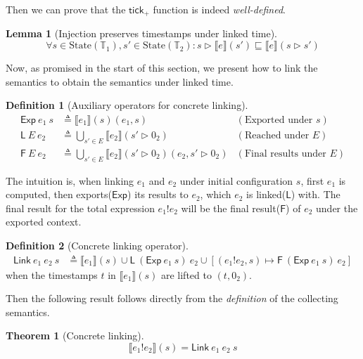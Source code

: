 \documentclass[acmsmall,review]{acmart}\settopmatter{printfolios=true,printccs=false,printacmref=false}
\theoremstyle{definition}
\newtheorem{definition}{Definition}[section]
\newtheorem{lem}{Lemma}[section]
\newtheorem{thm}{Theorem}[section]
\newcommand*{\Time}{\mathbb{T}}
\newcommand*{\State}[1]{\text{State}({#1})}
\newcommand*{\link}[2]{{#1}\mathtt{!}{#2}}
\newcommand*{\EE}{\mathsf{Exp}}
\newcommand*{\LL}{\mathsf{L}}
\newcommand*{\Link}{\mathsf{Link}}
\newcommand*{\sembracket}[1]{\lBrack{#1}\rBrack}
\newcommand*{\tick}{\mathsf{tick}}
\begin{document}
Then we can prove that the $\tick_+$ function is indeed \emph{well-defined}.

\begin{lem}[Injection preserves timestamps under linked time]
  \[
    \forall s\in\State{\Time_1},s'\in\State{\Time_2}:{s}\rhd{\sembracket{e}}({s'})\sqsubseteq{\sembracket{e}}({s}\rhd{s'})
  \]
\end{lem}

Now, as promised in the start of this section, we present how to link the semantics to obtain the semantics under linked time.

\begin{definition}[Auxiliary operators for concrete linking]
  \begin{align*}
    \EE\:e_1\:s        & \triangleq\sembracket{e_1}(s)(e_1,s)                                    & (\text{Exported under }s)      \\
    \LL\:E\:e_2        & \triangleq\bigcup_{s'\in E}\sembracket{e_2}(s'\rhd 0_2)                 & (\text{Reached under }E)       \\
    \mathsf{F}\:E\:e_2 & \triangleq\bigcup_{s'\in E}\sembracket{e_2}(s'\rhd 0_2)(e_2,s'\rhd 0_2) & (\text{Final results under }E)
  \end{align*}
\end{definition}

The intuition is, when linking $e_1$ and $e_2$ under initial configuration $s$, first $e_1$ is computed, then exports($\EE$) its results to $e_2$, which $e_2$ is linked($\LL$) with.
The final result for the total expression $\link{e_1}{e_2}$ will be the final result($\mathsf{F}$) of $e_2$ under the exported context.

\begin{definition}[Concrete linking operator]
  \begin{align*}
    \Link\:e_1\:e_2\:s & \triangleq\sembracket{e_1}(s)\cup\LL\:(\EE\:e_1\:s)\:e_2\cup[(\link{e_1}{e_2},s)\mapsto\mathsf{F}\:(\EE\:e_1\:s)\:e_2]
  \end{align*}
  when the timestamps $t$ in $\sembracket{e_1}(s)$ are lifted to $(t,0_2)$.
\end{definition}

Then the following result follows directly from the \emph{definition} of the collecting semantics.

\begin{thm}[Concrete linking]
  \[
    \sembracket{\link{e_1}{e_2}}(s)=\Link\:e_1\:e_2\:s
  \]
\end{thm}
\end{document}
